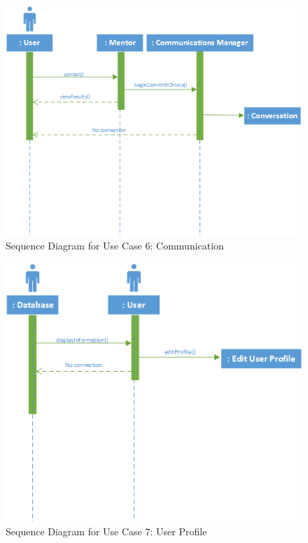 \documentclass[11pt]{article}
\begin{document}
            \begin{figure}[H]
            \centering
            \includegraphics{SequenceUseCase6Communication}
            \caption{Sequence Diagram for Use Case 6: Communication}
            \label{SUC6}
            \end{figure}

            \begin{figure}[H]
            \centering
            \includegraphics{SequenceUseCase7UserProfile}
            \caption{Sequence Diagram for Use Case 7: User Profile}
            \label{SUC7}
            \end{figure}
\end{document}
